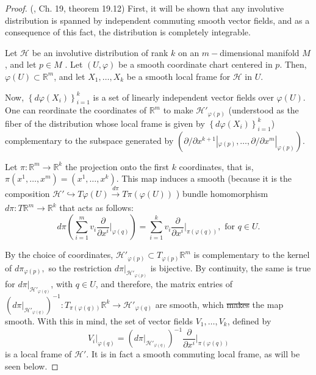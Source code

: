 \documentclass[12pt, letterpaper, reqno]{amsart}
\theoremstyle{definition}
\theoremstyle{plain}
\theoremstyle{remark}
\providecommand{\DIFadd}[1]{{\protect\color{blue}\uwave{#1}}} %
\providecommand{\DIFdel}[1]{{\protect\color{red}\sout{#1}}}                      %
\providecommand{\DIFaddbegin}{} %
\providecommand{\DIFaddend}{} %
\providecommand{\DIFdelbegin}{} %
\providecommand{\DIFdelend}{} %
\newcommand{\DIFscaledelfig}{0.5}
\newlength{\DIFdelgraphicswidth} %
\newlength{\DIFdelgraphicsheight} %
\newcommand{\DIFaddincludegraphics}[2][]{{\color{blue}\fbox{\DIFOincludegraphics[#1]{#2}}}} %
\newcommand{\DIFdelincludegraphics}[2][]{%
\sbox{\DIFdelgraphicsbox}{\DIFOincludegraphics[#1]{#2}}%
\settoboxwidth{\DIFdelgraphicswidth}{\DIFdelgraphicsbox} %
\settoboxtotalheight{\DIFdelgraphicsheight}{\DIFdelgraphicsbox} %
\scalebox{\DIFscaledelfig}{%
\parbox[b]{\DIFdelgraphicswidth}{\usebox{\DIFdelgraphicsbox}\\[-\baselineskip] \rule{\DIFdelgraphicswidth}{0em}}\llap{\resizebox{\DIFdelgraphicswidth}{\DIFdelgraphicsheight}{%
\setlength{\unitlength}{\DIFdelgraphicswidth}%
\begin{picture}(1,1)%
\thicklines\linethickness{2pt} %
{\color[rgb]{1,0,0}\put(0,0){\framebox(1,1){}}}%
{\color[rgb]{1,0,0}\put(0,0){\line( 1,1){1}}}%
{\color[rgb]{1,0,0}\put(0,1){\line(1,-1){1}}}%
\end{picture}%
}\hspace*{3pt}}} %
} %
\DeclareRobustCommand{\DIFaddbegin}{\DIFOaddbegin \let\includegraphics\DIFaddincludegraphics} %
\DeclareRobustCommand{\DIFaddend}{\DIFOaddend \let\includegraphics\DIFOincludegraphics} %
\DeclareRobustCommand{\DIFdelbegin}{\DIFOdelbegin \let\includegraphics\DIFdelincludegraphics} %
\DeclareRobustCommand{\DIFdelend}{\DIFOaddend \let\includegraphics\DIFOincludegraphics} %
\begin{document}
\begin{proof}
	(\cite{lee2003introduction}, Ch. 19, theorem 19.12) First, it will be shown that any involutive distribution is spanned by independent commuting smooth vector fields, and as a consequence of this fact, the distribution is completely integrable.

	Let $ \mathcal{H} $ be an involutive distribution of rank $ k $ on an $ m- $dimensional manifold $ M $, and let $ p\in M $ . Let $ (U,\varphi) $ be a smooth coordinate chart centered in $ p. $ Then, $ \varphi(U)\subset \mathbb{R}^m $, and let $ X_1,\dots,X_k $ be a smooth local frame for $ \mathcal{H} $ in $ U. $

	Now, $ \left\{ d\varphi \left( X_i \right) \right\}_{i=1}^k $ is a set of linearly independent vector fields over $ \varphi(U). $ One can reordinate the coordinates of $ \mathbb{R}^m $ to make $ \mathcal{H}'_{\varphi(p)} $ (understood as the fiber of the distribution whose local frame is given by $ \left\{ d\varphi \left( X_i \right) \right\}_{i=1}^k $) complementary to the subspace generated by $ \left( \partial/\partial x^{k+1}|_{\varphi(p)},\dots,\partial/\partial x^{m}|_{\varphi(p)} \right). $   

	Let $ \pi: \mathbb{R}^m \rightarrow  \mathbb{R}^k$ the projection onto the first $ k $ coordinates, that is, $ \pi(x^1,\dots,x^m)=(x^1,\dots,x^k). $ This map induces a smooth (because it is the composition $\mathcal{H}' \hookrightarrow T\varphi(U) \xrightarrow[]{d\pi} T\pi(\varphi(U))$ )  bundle homomorphism $ d\pi: T \mathbb{R}^m \rightarrow \mathbb{R}^k	 $ that acts as follows:
	$$ d\pi \left( \sum_{i=1}^m v_i \frac{\partial}{\partial x^i} \Big|_{\varphi(q)}   \right) = \sum_{i=1}^k v_i \frac{\partial}{\partial x^i} \Big|_{\pi(\varphi(q))}, \text{ for }q\in U.$$ 

	By the choice of coordinates, $ \mathcal{H}'_{\varphi(p)}\subset T_{\varphi(p)} \mathbb{R}^m $ is complementary to the kernel of $ d\pi_{\varphi(p)}, $ so the restriction $ d\pi|_{\mathcal{H}'_{\varphi(p)}} $ is bijective. By continuity, the same is true for $ d\pi|_{\mathcal{H}'_{\varphi(q)}} $, with $ q\in U $, and therefore, the matrix entries of $ \left(d\pi|_{\mathcal{H}'_{\varphi(q)}} \right)^{-1}: T_{\pi(\varphi(q))} \mathbb{R}^k \rightarrow \mathcal{H}'_{\varphi(q)}$ are smooth, which \DIFdelbegin \DIFdel{makes }\DIFdelend \DIFaddbegin \DIFadd{implies that }\DIFaddend the map smooth. With this in mind, the set of vector fields $ V_1,\dots,V_k $, defined by
	$$ V_i|_{\varphi(q)}= \left(  d\pi|_{\mathcal{H}'_{\varphi(q)}}  \right)^{-1} \frac{\partial}{\partial x^i} \Big|_{\pi(\varphi(q))} $$ 
	is a local frame of $ \mathcal{H'}. $ It is in fact a smooth commuting local frame, as will be seen below. 


\end{proof}
\end{document}
